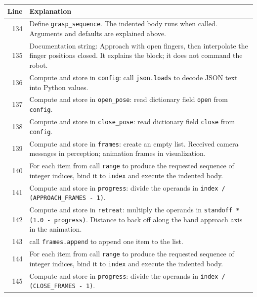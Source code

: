 \documentclass[11pt,a4paper]{book}
\begin{document}
\begin{longtable}{r p{}}

\textbf{Line} & \textbf{Explanation} \\ \hline \endhead

134 & Define \texttt{grasp\_sequence}. The indented body runs when called. Arguments and defaults are explained above. \\

135 & Documentation string: Approach with open fingers, then interpolate the finger positions closed. It explains the block; it does not command the robot. \\

136 & Compute and store in \texttt{config}: call \texttt{json.loads} to decode JSON text into Python values.  \\

137 & Compute and store in \texttt{open\_pose}: read dictionary field \texttt{open} from \texttt{config}.  \\

138 & Compute and store in \texttt{close\_pose}: read dictionary field \texttt{close} from \texttt{config}.  \\

139 & Compute and store in \texttt{frames}: create an empty list. Received camera messages in perception; animation frames in visualization. \\

140 & For each item from call \texttt{range} to produce the requested sequence of integer indices, bind it to \texttt{index} and execute the indented body. \\

141 & Compute and store in \texttt{progress}: divide the operands in \texttt{index / (APPROACH\_FRAMES - 1)}.  \\

142 & Compute and store in \texttt{retreat}: multiply the operands in \texttt{standoff * (1.0 - progress)}. Distance to back off along the hand approach axis in the animation. \\

143 & call \texttt{frames.append} to append one item to the list. \\

144 & For each item from call \texttt{range} to produce the requested sequence of integer indices, bind it to \texttt{index} and execute the indented body. \\

145 & Compute and store in \texttt{progress}: divide the operands in \texttt{index / (CLOSE\_FRAMES - 1)}.  \\


\end{longtable}
\end{document}
